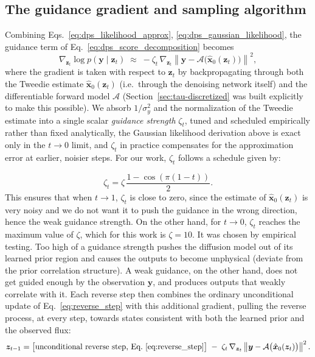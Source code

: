 \subsection{The guidance gradient and sampling algorithm}
\label{sec:dps_algorithm}

Combining Eqs.~\ref{eq:dps_likelihood_approx}, \ref{eq:dps_gaussian_likelihood}, the guidance term of Eq.~\ref{eq:dps_score_decomposition} becomes
\begin{equation}
\nabla_{\bm{z}_t}\log p(\bm{y}\mid\bm{z}_t) \;\approx\; -\zeta_t\,\nabla_{\bm{z}_t}\left\lVert\bm{y}-\mathcal{A}\big(\hat{\bm{x}}_0(\bm{z}_t)\big)\right\rVert^2,
\label{eq:dps_guidance}
\end{equation}
where the gradient is taken with respect to $\bm{z}_t$ by backpropagating through both the Tweedie estimate $\hat{\bm x}_0(\bm z_t)$ (i.e.\ through the denoising network itself) and the differentiable forward model $\mathcal{A}$ (Section~\ref{sec:tau-discretized} was built explicitly to make this possible). We absorb $1/\sigma_y^2$ and the normalization of the Tweedie estimate into a single scalar \emph{guidance strength} $\zeta_t$, tuned and scheduled empirically rather than fixed analytically, the Gaussian likelihood derivation above is exact only in the $t\to0$ limit, and $\zeta_t$ in practice compensates for the approximation error at earlier, noisier steps. For our work, $\zeta_t$ follows a schedule given by:

\begin{equation}
\zeta_t = \zeta\,\frac{1-\cos\left(\pi(1-t)\right)}{2}.
\label{eq:zeta_schedule}
\end{equation}
This ensures that when $t\rightarrow1$, $\zeta_t $ is close to zero, since the estimate of $\hat{\bm{x}}_0(\bm{z}_t)$ is very noisy and we do not want it to push the guidance in the wrong direction, hence the weak guidance strength. On the other hand, for $t\rightarrow0$, $\zeta_t$ reaches the maximum value of $\zeta$, which for this work is $\zeta=10$. It was chosen by empirical testing. Too high of a guidance strength pushes the diffusion model out of its learned prior region and causes the outputs to become unphysical (deviate from the prior correlation structure). A weak guidance, on the other hand, does not get guided enough by the observation $\bm{y}$, and produces outputs that weakly correlate with it.
Each reverse step then combines the ordinary unconditional update of Eq.~\ref{eq:reverse_step} with this additional gradient, pulling the reverse process, at every step, towards states consistent with both the learned prior and the observed flux:
\begin{equation}
\bm{z}_{t-1} = \big[\text{unconditional reverse step, Eq.~\ref{eq:reverse_step}}\big] \;-\; \zeta_t\,\nabla_{\bm{z}_t}\left\lVert\bm{y}-\mathcal{A}\big(\hat{\bm{x}}_0(\bm{z}_t)\big)\right\rVert^2.
\label{eq:dps_reverse_step}
\end{equation}

